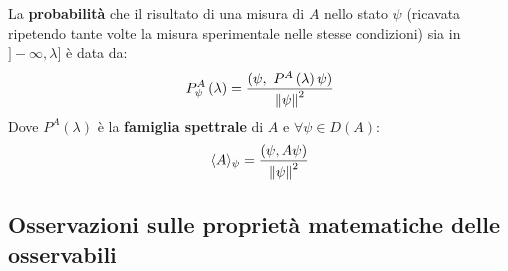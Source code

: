 \documentclass[../../FisicaTeorica.tex]{subfiles}
\begin{document}
\begin{axi}
La \textbf{probabilità} che il risultato di una misura di $A$ nello stato $\psi$ (ricavata ripetendo tante volte la misura sperimentale nelle stesse condizioni) sia in $]-\infty , \lambda]$ è data da:
\[
P_\psi^A\left(\lambda\right)=\frac{(\psi,\ P^A\left(\lambda\right)\psi)}{\norm{\psi}^2}
\]
Dove $P^A\left(\lambda\right)$ è la \textbf{famiglia spettrale} di $A$ e $\forall \psi \in D\left(A\right)$:
\[
\langle A \rangle_\psi = \frac{(\psi, A\psi)}{\left\lVert\psi\right\rVert^2}
\]
\end{axi}

\subsection{Osservazioni sulle proprietà matematiche delle osservabili}
\end{document}

